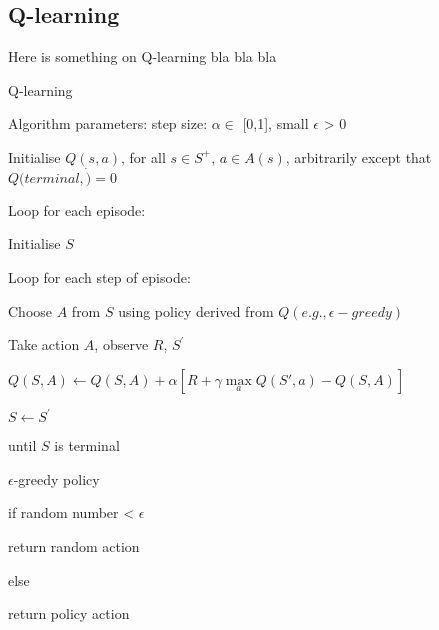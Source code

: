 \documentclass[../Head/Main.tex]{subfiles}
\begin{document}
\subsection{Q-learning}
Here is something on Q-learning
bla bla bla
\begin{Pseudo}{Q-learning}{}
\begin{Indentation}
    \item Algorithm parameters: step size: $\alpha\in$ [0,1], small  $\epsilon$ > 0 \vspace{-2pt}
    \item Initialise $Q(s,a)$, for all $s\in S^{+}$, $a\in A(s)$, arbitrarily except that $Q(terminal,\dot)=0$
    \item Loop for each episode: \vspace{-2pt}
    \begin{Indentation}
        \item Initialise $S$ \vspace{-2pt}
        \item Loop for each step of episode: \vspace{-2pt}
        \begin{Indentation}
            \item Choose $A$ from $S$ using policy derived from $Q(e.g., \epsilon-greedy)$ \vspace{-2pt}
            \item Take action $A$, observe $R$, $S^{'}$ \vspace{-1pt}
            \item $Q(S,A) \leftarrow Q(S,A) + \alpha \left[R + \gamma \max\limits_{a} Q(S',a) - Q(S,A)\right]$
            \item $S\leftarrow S^{'}$ \vspace{-2pt}
        \end{Indentation}
        \item until $S$ is terminal 
    \end{Indentation}
\end{Indentation}
\end{Pseudo}


\begin{Pseudo}{$\epsilon$-greedy policy}{}
	\begin{Indentation}
		\item if random number < $\epsilon$ \vspace{-2pt}
			\begin{Indentation}
				\item return random action \vspace{-2pt}
			\end{Indentation}
		\item else \vspace{-2pt}
		\begin{Indentation}
			\item return policy action
		\end{Indentation}
	\end{Indentation}
\end{Pseudo}
\end{document}
